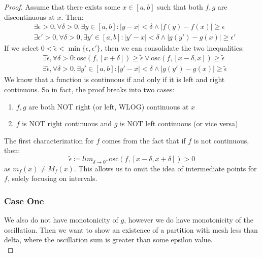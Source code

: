 \documentclass[10pt,letterpaper]{article} %
\begin{document}
\begin{proof}
Assume that there exists some $x \in [a, b]$ such that both $f, g$ are discontinuous at $x$. Then:
\begin{align*}
  &\exists \epsilon > 0, \forall \delta > 0, \exists y \in [a, b]: |y - x| < \delta \land |f(y) - f(x)| \geqslant \epsilon\\
  &\exists \epsilon' > 0, \forall \delta > 0, \exists y' \in [a, b]: |y' - x| < \delta \land |g(y') - g(x)| \geqslant \epsilon'
\end{align*}
If we select $0 < \tilde{\epsilon} < \min\{\epsilon, \epsilon'\}$, then we can consolidate the two inequalities:
\begin{align*}
  &\exists \tilde{\epsilon}, \forall \delta > 0: \text{osc}(f, [x + \delta]) \geqslant \tilde{\epsilon} \lor \text{osc}(f, [x - \delta, x]) \geqslant \tilde{\epsilon}\\
  &\exists \tilde{\epsilon}, \forall \delta > 0, \exists y' \in [a, b]: |y' - x| < \delta \land |g(y') - g(x)| \geqslant \tilde{\epsilon}
\end{align*}
We know that a function is continuous if and only if it is left and right continuous. So in fact, the proof breaks into two cases:
\begin{enumerate}
\item $f, g$ are both NOT right (or left, WLOG) continuous at $x$
\item $f$ is NOT right continuous and $g$ is NOT left continuous (or vice versa)
\end{enumerate}
The first characterization for $f$ comes from the fact that if $f$ is not continuous, then:
\begin{equation*}
\tilde{\epsilon} \coloneq lim_{\delta \xrightarrow{} 0^+}\text{osc}(f, [x - \delta, x + \delta]) > 0
\end{equation*}
as $m_f(x) \neq M_f(x)$. This allows us to omit the idea of intermediate points for $f$, solely focusing on intervals.

\subsubsection*{Case One}

We also do not have monotonicity of $g$, however we do have monotonicity of the oscillation. Then we want to show an existence of a partition with mesh less than delta, where the oscillation sum is greater than some epsilon value.\\


\end{proof}
\end{document}
